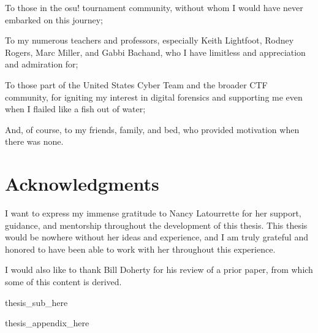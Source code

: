 \documentclass[letterpaper,12pt]{report}
\begin{document}
To those in the osu! tournament community, without whom I would have
never embarked on this journey;

To my numerous teachers and professors, especially Keith Lightfoot,
Rodney Rogers, Marc Miller, and Gabbi Bachand, who I have limitless and
appreciation and admiration for;

To those part of the United States Cyber Team and the broader CTF
community, for igniting my interest in digital forensics and supporting
me even when I flailed like a fish out of water;

And, of course, to my friends, family, and bed, who provided motivation
when there was none.


\newpage

\section*{Acknowledgments}

I want to express my immense gratitude to Nancy Latourrette for her
support, guidance, and mentorship throughout the development of this
thesis. This thesis would be nowhere without her ideas and experience,
and I am truly grateful and honored to have been able to work with her
throughout this experience.

I would also like to thank Bill Doherty for his review of a prior paper,
from which some of this content is derived.


\newpage
\renewcommand*\contentsname{Table of Contents}
\tableofcontents

\newpage
\listoftables

\newpage
\listoffigures

\newpage
\renewcommand{\lstlistlistingname}{List of Code Listings}
\lstlistoflistings

\newpage
{}
\setcounter{page}{1}
\linespread{2}

{{thesis_sub_here}}

\printglossary[type=\acronymtype]
\printglossary

\singlespacing


\doublespacing
\appendix

\appendix

{{thesis_appendix_here}}
\end{document}
